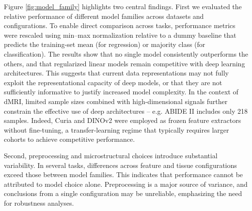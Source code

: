 Figure \ref{fig:model_family} highlights two central findings.
First we evaluated the relative performance of different model families across datasets and configurations.
To enable direct comparison across tasks, performance metrics were rescaled using min–max normalization relative to a dummy baseline that predicts the training-set mean (for regression) or majority class (for classification).
The results show that no single model consistently outperforms the others, and that regularized linear models remain competitive with deep learning architectures.
This suggests that current data representations may not fully exploit the representational capacity of deep models, or that they are not sufficiently informative to justify increased model complexity.
In the context of dMRI, limited sample sizes combined with high-dimensional signals further constrain the effective use of deep architectures -- e.g. ABIDE II includes only 218 samples.
Indeed, Curia and DINOv2 were employed as frozen feature extractors without fine-tuning, a transfer-learning regime that typically requires larger cohorts to achieve competitive performance.

Second, preprocessing and microstructural choices introduce substantial variability.
In several tasks, differences across feature and tissue configurations exceed those between model families.
This indicates that performance cannot be attributed to model choice alone.
Preprocessing is a major source of variance, and conclusions from a single configuration may be unreliable, emphasizing the need for robustness analyses.

